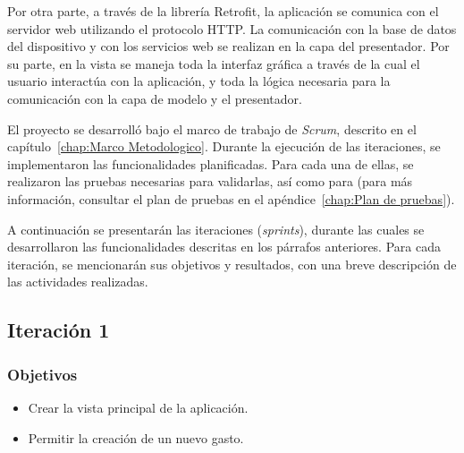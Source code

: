Por otra parte, a través de la librería Retrofit, la aplicación se comunica con el servidor web utilizando el protocolo HTTP. La comunicación con la base de datos del dispositivo y con los servicios web se realizan en la capa del presentador. Por su parte, en la vista se maneja toda la interfaz gráfica a través de la cual el usuario interactúa con la aplicación, y toda la lógica necesaria para la comunicación con la capa de modelo y el presentador.

El proyecto se desarrolló bajo el marco de trabajo de \textit{Scrum}, descrito en el capítulo~\ref{chap:Marco Metodologico}. Durante la ejecución de las iteraciones, se implementaron las funcionalidades planificadas. Para cada una de ellas, se realizaron las pruebas necesarias para validarlas, así como para (para más información, consultar el plan de pruebas en el apéndice~\ref{chap:Plan de pruebas}). 

A continuación se presentarán las iteraciones (\textit{sprints}), durante las cuales se desarrollaron las funcionalidades descritas en los párrafos anteriores. Para cada iteración, se mencionarán sus objetivos y resultados, con una breve descripción de las actividades realizadas.

\subsection{Iteración 1}

\subsubsection{Objetivos}
	\begin{itemize}
	\item Crear la vista principal de la aplicación.
	\item Permitir la creación de un nuevo gasto.
	\end{itemize}

